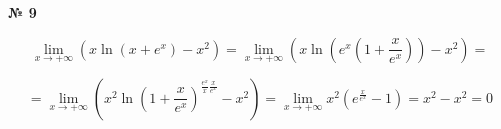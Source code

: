 \documentclass{article}
\begin{document}
\textbf{№ 9} 

\begingroup
\Large

$$ \lim\limits_{x \to +\infty} \left( x\ln{(x+e^x)} - x^2 \right)
= \lim\limits_{x \to +\infty} \left( x\ln{(e^x(1+\frac{x}{e^x}))} - x^2 \right)
= $$

$$ = \lim\limits_{x \to +\infty} \left( x^2 \ln{(1+\frac{x}{e^x})}^{\frac{e^x}{x}\frac{x}{e^x}} - x^2 \right)
= \lim\limits_{x \to +\infty} x^2 \left( e^{\frac{x}{e^x}} - 1 \right)
= x^2 - x^2 
= 0 $$

\endgroup
\end{document}
